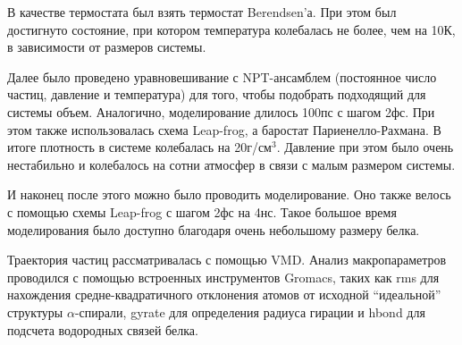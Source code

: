 \documentclass[
11pt,%
tightenlines,%
twoside,%
onecolumn,%
nofloats,%
nobibnotes,%
nofootinbib,%
superscriptaddress,%
noshowpacs,%
centertags]%
{revtex4}
\begin{document}
В качестве термостата был взять термостат Berendsen'а.
При этом был достигнуто состояние, при котором температура колебалась не более, чем на 10К,
в зависимости от размеров системы. \par
Далее было проведено уравновешивание с NPT-ансамблем (постоянное число частиц, давление и температура)
для того, чтобы подобрать подходящий для системы объем. 
Аналогично, моделирование длилось 100пс с шагом 2фс.
При этом также использовалась схема Leap-frog, а баростат Париенелло-Рахмана.
В итоге плотность в системе колебалась на 20г/см$^3$. 
Давление при этом было очень нестабильно и колебалось на сотни атмосфер в связи с малым размером системы. \par
И наконец после этого можно было проводить моделирование. 
Оно также велось с помощью схемы  Leap-frog с шагом 2фс на 4нс. 
Такое большое время моделирования было доступно благодаря очень небольшому размеру белка. \par
Траектория частиц рассматривалась с помощью VMD. 
Анализ макропараметров проводился с помощью встроенных инструментов Gromacs, 
таких как rms для нахождения средне-квадратичного отклонения атомов от исходной ``идеальной'' структуры $\alpha$-спирали, gyrate для определения радиуса гирации и hbond для подсчета водородных связей белка.
\end{document}
